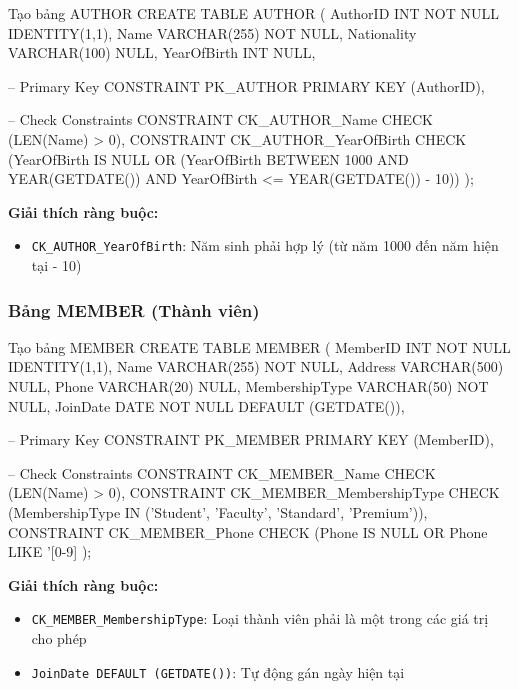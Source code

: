 \documentclass[12pt,a4paper]{article}
\begin{document}
\begin{sqlcode}{Tạo bảng AUTHOR}
CREATE TABLE AUTHOR (
    AuthorID         INT            NOT NULL   IDENTITY(1,1),
    Name             VARCHAR(255)   NOT NULL,
    Nationality      VARCHAR(100)   NULL,
    YearOfBirth      INT            NULL,

    -- Primary Key
    CONSTRAINT PK_AUTHOR PRIMARY KEY (AuthorID),

    -- Check Constraints
    CONSTRAINT CK_AUTHOR_Name
        CHECK (LEN(Name) > 0),
    CONSTRAINT CK_AUTHOR_YearOfBirth
        CHECK (YearOfBirth IS NULL
               OR (YearOfBirth BETWEEN 1000 AND YEAR(GETDATE()) AND YearOfBirth <= YEAR(GETDATE()) - 10))
);
\end{sqlcode}

\textbf{Giải thích ràng buộc:}
\begin{itemize}
    \item \texttt{CK\_AUTHOR\_YearOfBirth}: Năm sinh phải hợp lý (từ năm 1000 đến năm hiện tại - 10)
\end{itemize}

\subsubsection{Bảng MEMBER (Thành viên)}

\begin{sqlcode}{Tạo bảng MEMBER}
CREATE TABLE MEMBER (
    MemberID         INT            NOT NULL   IDENTITY(1,1),
    Name             VARCHAR(255)   NOT NULL,
    Address          VARCHAR(500)   NULL,
    Phone            VARCHAR(20)    NULL,
    MembershipType   VARCHAR(50)    NOT NULL,
    JoinDate         DATE           NOT NULL   DEFAULT (GETDATE()),

    -- Primary Key
    CONSTRAINT PK_MEMBER PRIMARY KEY (MemberID),

    -- Check Constraints
    CONSTRAINT CK_MEMBER_Name
        CHECK (LEN(Name) > 0),
    CONSTRAINT CK_MEMBER_MembershipType
        CHECK (MembershipType IN ('Student', 'Faculty', 'Standard', 'Premium')),
    CONSTRAINT CK_MEMBER_Phone
        CHECK (Phone IS NULL OR Phone LIKE '[0-9]%
);
\end{sqlcode}

\textbf{Giải thích ràng buộc:}
\begin{itemize}
    \item \texttt{CK\_MEMBER\_MembershipType}: Loại thành viên phải là một trong các giá trị cho phép
    \item \texttt{JoinDate DEFAULT (GETDATE())}: Tự động gán ngày hiện tại
\end{itemize}
\end{document}
